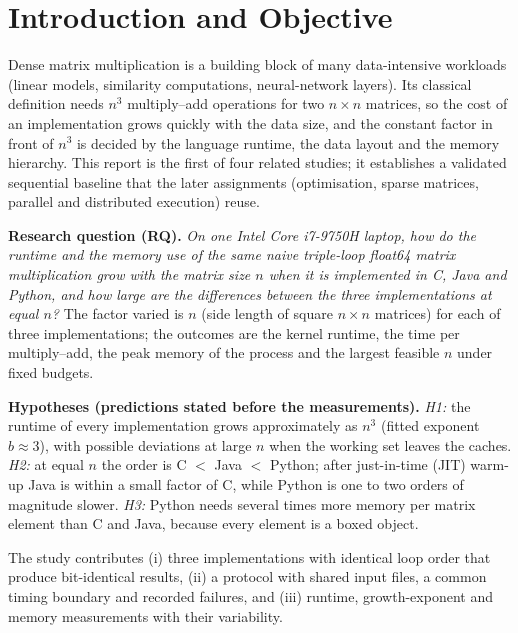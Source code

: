 \documentclass[conference,a4paper]{IEEEtran}
\begin{document}
\section{Introduction and Objective}
\label{sec:intro}
Dense matrix multiplication is a building block of many data-intensive workloads (linear models, similarity
computations, neural-network layers). Its classical definition needs $n^3$ multiply--add operations for two
$n\times n$ matrices, so the cost of an implementation grows quickly with the data size, and the constant factor
in front of $n^3$ is decided by the language runtime, the data layout and the memory hierarchy. This report is the
first of four related studies; it establishes a validated sequential baseline that the later assignments
(optimisation, sparse matrices, parallel and distributed execution) reuse.

\textbf{Research question (RQ).} \emph{On one Intel Core i7-9750H laptop, how do the runtime and the memory use of
the same naive triple-loop float64 matrix multiplication grow with the matrix size $n$ when it is implemented in C,
Java and Python, and how large are the differences between the three implementations at equal $n$?}
The factor varied is $n$ (side length of square $n\times n$ matrices) for each of three implementations; the
outcomes are the kernel runtime, the time per multiply--add, the peak memory of the process and the largest
feasible $n$ under fixed budgets.

\textbf{Hypotheses (predictions stated before the measurements).}
\emph{H1:} the runtime of every implementation grows approximately as $n^3$ (fitted exponent $b\approx3$), with
possible deviations at large $n$ when the working set leaves the caches.
\emph{H2:} at equal $n$ the order is C $<$ Java $<$ Python; after just-in-time (JIT) warm-up Java is within a small
factor of C, while Python is one to two orders of magnitude slower.
\emph{H3:} Python needs several times more memory per matrix element than C and Java, because every element is a
boxed object.

The study contributes (i) three implementations with identical loop order that produce bit-identical results,
(ii) a protocol with shared input files, a common timing boundary and recorded failures, and (iii) runtime,
growth-exponent and memory measurements with their variability.

\end{document}
